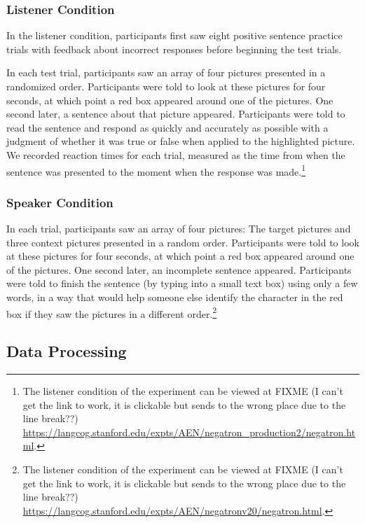 \documentclass[man, noapacite]{apa2}
\begin{document}
\subsubsection{Listener Condition}

In the listener condition, participants first saw eight positive sentence practice trials with feedback about incorrect responses before beginning the test trials. 

In each test trial, participants saw an array of four pictures presented in a randomized order.  Participants were told to look at these pictures for four seconds, at which point a red box appeared around one of the pictures.  One second later, a sentence about that picture appeared.  Participants were told to read the sentence and respond as quickly and accurately as possible with a judgment of whether it was true or false when applied to the highlighted picture.  We recorded reaction times for each trial, measured as the time from when the sentence was presented to the moment when the response was made.\footnote{The listener condition of the experiment can be viewed at 
FIXME (I can't get the link to work, it is clickable but sends to the wrong place due to the line break??) \url{https://langcog.stanford.edu/expts/AEN/negatron_production2/negatron.html}.}

\subsubsection{Speaker Condition}

In each trial, participants saw an array of four pictures: The target pictures and three context pictures presented in a random order.  Participants were told to look at these pictures for four seconds, at which point a red box appeared around one of the pictures.  One second later, an incomplete sentence appeared.  Participants were told to finish the sentence (by typing into a small text box) using only a few words, in a way that would help someone else identify the character in the red box if they saw the pictures in a different order.\footnote{The listener condition of the experiment can be viewed at 
FIXME (I can't get the link to work, it is clickable but sends to the wrong place due to the line break??) \url{https://langcog.stanford.edu/expts/AEN/negatronv20/negatron.html}.}
  

 
 \subsection{Data Processing} 
  
\end{document}
